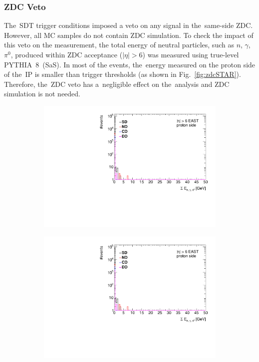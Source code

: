 \subsubsection{ZDC Veto}\label{section:star_zdc_selection}
The~SDT trigger conditions imposed a veto on any signal in the~same-side ZDC. However, all MC samples do not contain ZDC simulation. To check the impact of this veto on the measurement, the total energy of neutral particles, such as $n$, $\gamma$, $\pi^{0}$, produced within ZDC acceptance ($|\eta|>6$) was measured using true-level PYTHIA~8~(SaS). In most of the events, the~energy measured on the proton side of the~IP is smaller than trigger thresholds (as shown in Fig.~\ref{fig:zdcSTAR}). Therefore, the~ZDC veto has a~negligible effect on the~analysis and ZDC simulation is not needed.


\begin{figure}[t!]
	\centering
	\begin{subfigure}{.45\textwidth}
		\includegraphics[width=\textwidth, page=1]{chapters/chrgSTAR/img/zdc/out.pdf}
	\end{subfigure}
	\begin{subfigure}{.45\textwidth}
		\includegraphics[width=\textwidth, page=2]{chapters/chrgSTAR/img/zdc/out.pdf}

\end{subfigure}
\end{figure}
